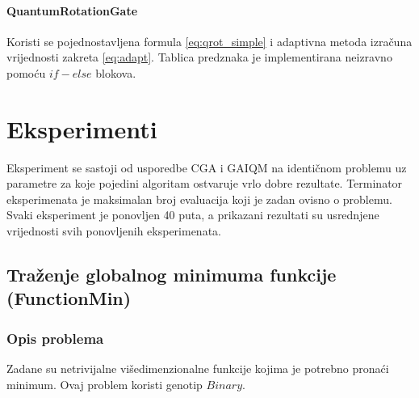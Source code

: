 \documentclass[times, utf8, zavrsni, numeric]{fer}
\begin{document}
\subsubsection{QuantumRotationGate}
Koristi se pojednostavljena formula \ref{eq:qrot_simple} i adaptivna metoda izračuna vrijednosti zakreta \ref{eq:adapt}. Tablica predznaka je implementirana neizravno pomoću $if-else$ blokova.

\chapter{Eksperimenti} 
\label{ch:primjena}
Eksperiment se sastoji od usporedbe CGA i GAIQM na identičnom problemu uz parametre za koje pojedini algoritam ostvaruje vrlo dobre rezultate.
Terminator eksperimenata je maksimalan broj evaluacija koji je zadan ovisno o problemu.
Svaki eksperiment je ponovljen 40 puta, a prikazani rezultati su usrednjene vrijednosti svih ponovljenih eksperimenata.

\section{Traženje globalnog minimuma funkcije (FunctionMin)}
\subsection{Opis problema}
Zadane su netrivijalne višedimenzionalne funkcije kojima je potrebno pronaći minimum.
Ovaj problem koristi genotip $Binary$.
\end{document}
